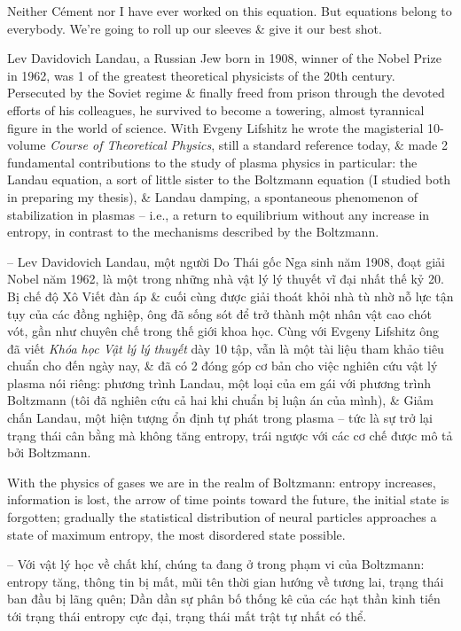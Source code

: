 \documentclass{article}
\begin{document}
\begin{enumerate}
	Neither C\'ement nor I have ever worked on this equation. But equations belong to everybody. We're going to roll up our sleeves \& give it our best shot.
	
	{\sc Lev Davidovich Landau}, a Russian Jew born in 1908, winner of the Nobel Prize in 1962, was 1 of the greatest theoretical physicists of the 20th century. Persecuted by the Soviet regime \& finally freed from prison through the devoted efforts of his colleagues, he survived to become a towering, almost tyrannical figure in the world of science. With {\sc Evgeny Lifshitz} he wrote the magisterial 10-volume {\it Course of Theoretical Physics}, still a standard reference today, \& made 2 fundamental contributions to the study of plasma physics in particular: the Landau equation, a sort of little sister to the Boltzmann equation (I studied both in preparing my thesis), \& Landau damping, a spontaneous phenomenon of stabilization in plasmas -- i.e., a return to equilibrium without any increase in entropy, in contrast to the mechanisms described by the {\sc Boltzmann}.
	
	-- {\sc Lev Davidovich Landau}, một người Do Thái gốc Nga sinh năm 1908, đoạt giải Nobel năm 1962, là một trong những nhà vật lý lý thuyết vĩ đại nhất thế kỷ 20. Bị chế độ Xô Viết đàn áp \& cuối cùng được giải thoát khỏi nhà tù nhờ nỗ lực tận tụy của các đồng nghiệp, ông đã sống sót để trở thành một nhân vật cao chót vót, gần như chuyên chế trong thế giới khoa học. Cùng với {\sc Evgeny Lifshitz} ông đã viết {\it Khóa học Vật lý lý thuyết} dày 10 tập, vẫn là một tài liệu tham khảo tiêu chuẩn cho đến ngày nay, \& đã có 2 đóng góp cơ bản cho việc nghiên cứu vật lý plasma nói riêng: phương trình Landau, một loại của em gái với phương trình Boltzmann (tôi đã nghiên cứu cả hai khi chuẩn bị luận án của mình), \& Giảm chấn Landau, một hiện tượng ổn định tự phát trong plasma -- tức là sự trở lại trạng thái cân bằng mà không tăng entropy, trái ngược với các cơ chế được mô tả bởi {\sc Boltzmann}.
	
	With the physics of gases we are in the realm of {\sc Boltzmann}: entropy increases, information is lost, the arrow of time points toward the future, the initial state is forgotten; gradually the statistical distribution of neural particles approaches a state of maximum entropy, the most disordered state possible.
	
	-- Với vật lý học về chất khí, chúng ta đang ở trong phạm vi của {\sc Boltzmann}: entropy tăng, thông tin bị mất, mũi tên thời gian hướng về tương lai, trạng thái ban đầu bị lãng quên; Dần dần sự phân bố thống kê của các hạt thần kinh tiến tới trạng thái entropy cực đại, trạng thái mất trật tự nhất có thể.
	

\end{enumerate}
\end{document}
